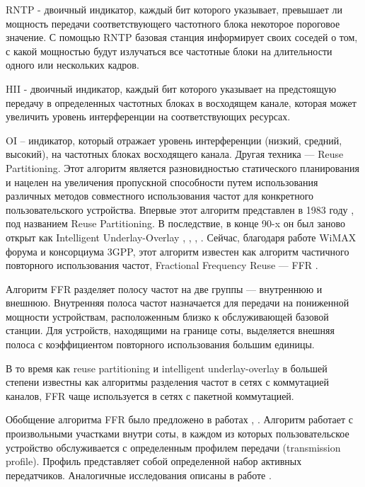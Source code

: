 RNTP - двоичный индикатор, каждый бит которого указывает, превышает ли мощность передачи соответствующего частотного блока некоторое пороговое значение. С помощью RNTP базовая станция информирует своих соседей о том, с какой мощностью будут излучаться все частотные блоки на длительности одного или нескольких кадров.

HII - двоичный индикатор, каждый бит которого указывает на предстоящую передачу в определенных частотных блоках в восходящем канале, которая может увеличить уровень интерференции на соответствующих ресурсах.

OI – индикатор, который отражает уровень интерференции (низкий, средний, высокий), на частотных блоках восходящего канала.
Другая техника — Reuse Partitioning. Этот алгоритм является разновидностью статического планирования и нацелен на увеличения пропускной способности путем использования различных методов совместного использования частот для конкретного пользовательского устройства. Впервые этот алгоритм представлен в 1983 году \cite{halpern1983reuse}, под названием Reuse Partitioning. В последствие, в конце 90-x он был заново открыт как Intelligent Underlay-Overlay \cite{ling1996capacity}, \cite{wille1996capacity}, \cite{nielsen1997capacity}, \cite{wigard1997improved}. Сейчас, благодаря работе WiMAX форума и консорциума 3GPP, этот алгоритм известен как алгоритм частичного повторного использования частот, Fractional Frequency Reuse — FFR \cite{wimax2006technical}.

Алгоритм FFR разделяет полосу частот на две группы — внутреннюю и внешнюю. Внутренняя полоса частот назначается для передачи на пониженной мощности устройствам, расположенным близко к обслуживающей базовой станции. Для устройств, находящими на границе соты, выделяется внешняя полоса с коэффициентом повторного использования большим единицы.

В то время как reuse partitioning и intelligent underlay-overlay в большей степени известны как алгоритмы разделения частот в сетях с коммутацией каналов, FFR чаще используется в сетях с пакетной коммутацией.

Обобщение алгоритма FFR было предложено в работах \cite{bonald2005inter}, \cite{bonald2006inter}. Алгоритм работает с произвольными участками внутри соты, в каждом из которых пользовательское устройство обслуживается с определенным профилем передачи (transmission profile). Профиль представляет собой определенной набор активных передатчиков. Аналогичные исследования описаны в работе \cite{liu2006inter}.

